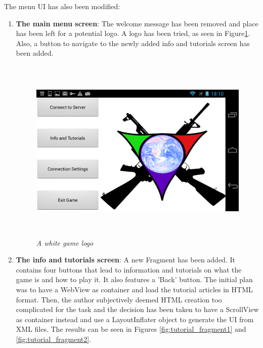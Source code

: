 \documentclass{article}
\begin{document}
The menu UI has also been modified:
\begin{enumerate}
  \item \textbf{The main menu screen}: The welcome message has been removed and
  place has been left for a potential logo. A logo has been tried, as seen in
  Figure\ref{fig:logo_white}. Also, a button to navigate to the newly added info
  and tutorials screen has been added.
  
  \begin{figure}
  \includegraphics[height=3.5in,width=6.23in]{./images/android_screenshots/logo_white.png}
  \caption{\small \sl A white game logo \label{fig:logo_white}}
  \end{figure}
  
  \item \textbf{The info and tutorials screen}: A new Fragment has been added.
  It contains four buttons that lead to information and tutorials on what the
  game is and how to play it. It also features a 'Back' button. The initial plan
  was to have a WebView as container and load the tutorial articles in HTML
  format. Then, the author subjectively deemed HTML creation too complicated for
  the task and the decision has been taken to have a ScrollView as container
  instead and use a LayoutInflater object to generate the UI from XML files. The
  results can be seen in Figures \ref{fig:tutorial_fragment1} and
  \ref{fig:tutorial_fragment2}.
  

\end{enumerate}
\end{document}
